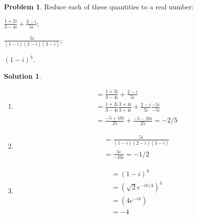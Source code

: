 \documentclass[10pt]{article}
\theoremstyle{definition}
\newtheorem{problem}{Problem}
\newtheorem{soln}{Solution}
\begin{document}
\begin{problem}
Reduce each of these quantities to a real number:\\
\begin{center}
  \begin{enumerate*}[label=(\alph*)]
    \item $\displaystyle\frac{1+2i}{3-4i}+\frac{2-i}{5i}$;\qquad~
    \item $\displaystyle\frac{5i}{(1-i)(2-i)(3-i)}$;\qquad~
    \item $\displaystyle(1-i)^4$.
  \end{enumerate*}
\end{center}
\end{problem}
\begin{soln}~
  \begin{enumerate}[label=(\alph*)]
    \item \begin{align*}
             & =\frac{1+2i}{3-4i}+\frac{2-i}{5i}                                 \\
             & =\frac{1+2i}{3-4i}\frac{3+4i}{3+4i}+\frac{2-i}{5i}\frac{-5i}{-5i} \\
             & =\frac{-5+10i}{25}+\frac{-5-10i}{25}=-2/5
          \end{align*}
    \item \begin{align*}
             & =\frac{5i}{(1-i)(2-i)(3-i)} \\
             & =\frac{5i}{-10i}=-1/2
          \end{align*}
    \item \begin{align*}
             & =(1-i)^4                 \\
             & =(\sqrt{2}e^{-i\pi/4})^4 \\
             & =(4e^{-i\pi})            \\
             & =-4
          \end{align*}
  \end{enumerate}
\end{soln}
\end{document}
